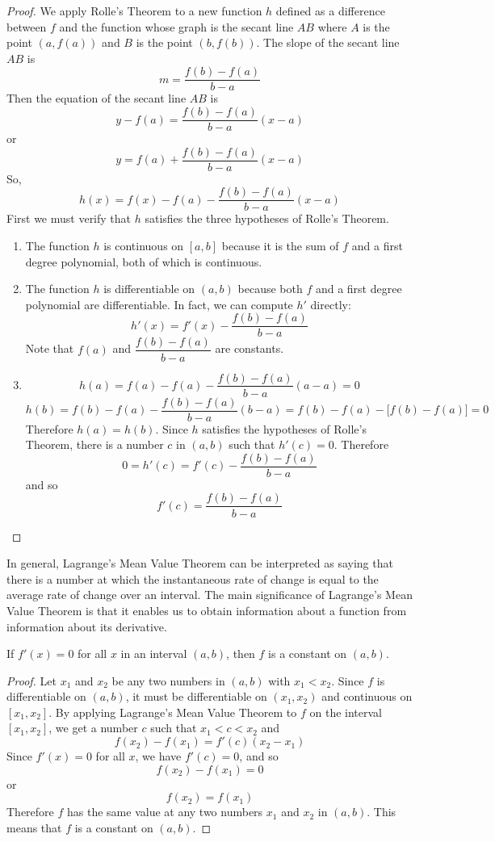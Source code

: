 \begin{proof}
    We apply Rolle's Theorem to a new function \(h\) defined as a difference
    between \(f\) and the function whose graph is the secant line \(AB\) where
    \(A\) is the point \((a,f(a))\) and \(B\) is the point \((b,f(b))\).
    The slope of the secant line \(AB\) is
    \[m=\frac{f(b)-f(a)}{b-a}\]
    Then the equation of the secant line \(AB\) is
    \[y-f(a)=\frac{f(b)-f(a)}{b-a}(x-a)\]
    or
    \[y=f(a)+\frac{f(b)-f(a)}{b-a}(x-a)\]
    So,
    \[h(x)=f(x)-f(a)-\frac{f(b)-f(a)}{b-a}(x-a)\]
    First we must verify that \(h\) satisfies the three hypotheses of Rolle's
    Theorem.
    \begin{enumerate}
        \item The function \(h\) is continuous on \([a,b]\) because it is the
        sum of \(f\) and a first degree polynomial, both of which is
        continuous.
        \item The function \(h\) is differentiable on \((a,b)\) because both
        \(f\) and a first degree polynomial are differentiable.
        In fact, we can compute \(h'\) directly:
        \[h'(x)=f'(x)-\frac{f(b)-f(a)}{b-a}\]
        Note that \(f(a)\) and \(\dfrac{f(b)-f(a)}{b-a}\) are constants.
        \item
        \[h(a)=f(a)-f(a)-\frac{f(b)-f(a)}{b-a}(a-a)=0\]
        \[h(b)=f(b)-f(a)-\frac{f(b)-f(a)}{b-a}(b-a)
        =f(b)-f(a)-\big[f(b)-f(a)\big]=0\]
        Therefore \(h(a)=h(b)\).
        Since \(h\) satisfies the hypotheses of Rolle's Theorem,
        there is a number \(c\) in \((a,b)\) such that \(h'(c)=0\).
        Therefore
        \[0=h'(c)=f'(c)-\frac{f(b)-f(a)}{b-a}\]
        and so
        \[f'(c)=\frac{f(b)-f(a)}{b-a}\]
    \end{enumerate}
\end{proof}
In general, Lagrange's Mean Value Theorem can be interpreted as saying that
there is a number at which the instantaneous rate of change is equal to the
average rate of change over an interval.
The main significance of Lagrange's Mean Value Theorem is that it enables
us to obtain information about a function from information about its
derivative.
\begin{theorem}
    If \(f'(x)=0\) for all \(x\) in an interval \((a,b)\), then \(f\) is a
    constant on \((a,b)\).
\end{theorem}
\begin{proof}
    Let \(x_1\) and \(x_2\) be any two numbers in \((a,b)\) with \(x_1<x_2\).
    Since \(f\) is differentiable on \((a,b)\), it must be differentiable on
    \((x_1,x_2)\) and continuous on \([x_1,x_2]\).
    By applying Lagrange's Mean Value Theorem to \(f\) on the interval
    \([x_1,x_2]\), we get a number \(c\) such that \(x_1<c<x_2\) and
    \[f(x_2)-f(x_1)=f'(c)(x_2-x_1)\]
    Since \(f'(x)=0\) for all \(x\), we have \(f'(c)=0\), and so
    \[f(x_2)-f(x_1)=0\]
    or
    \[f(x_2)=f(x_1)\]
    Therefore \(f\) has the same value at any two numbers \(x_1\) and \(x_2\)
    in \((a,b)\).
    This means that \(f\) is a constant on \((a,b)\).
\end{proof}
